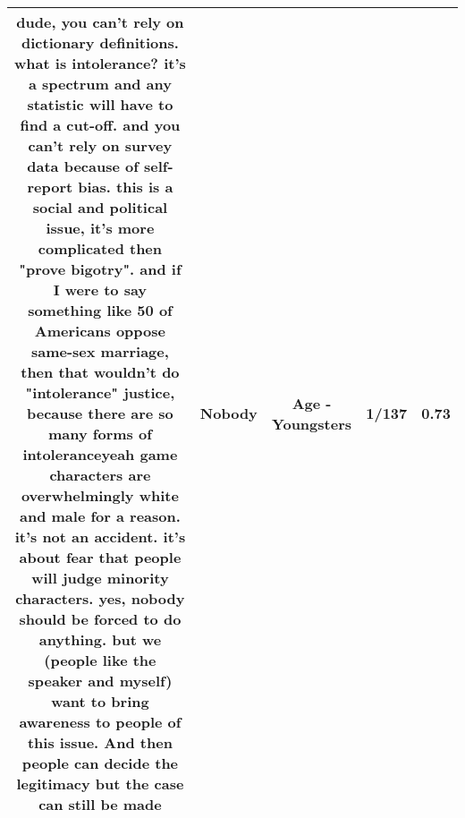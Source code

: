 \documentclass[11pt]{article}
\newlength\mylength
\begin{document}
\begin{center}
\begin{longtable}{|C{.65\mylength}|C{.30\mylength}|C{.12\mylength}|C{.12\mylength}|C{.12\mylength}|}
  \small dude, you can't rely on dictionary definitions. what is intolerance? it's a spectrum and any statistic will have to find a cut-off. and you can't rely on survey data because of self-report bias. this is a social and political issue, it's more complicated then "prove bigotry". and if I were to say something like 50 of Americans oppose same-sex marriage, then that wouldn't do "intolerance" justice, because there are so many forms of intoleranceyeah game characters are overwhelmingly white and male for a reason. it's not an accident. it's about fear that people will judge minority characters. yes, \textbf{nobody} should be forced to do anything. but we (people like the speaker and myself) want to bring awareness to people of this issue. And then people can decide the legitimacy but the case can still be made\normalsize   & Nobody & Age - Youngsters & 1/137 & 0.73 \\  \hline

\end{longtable}
\end{center}
\end{document}
